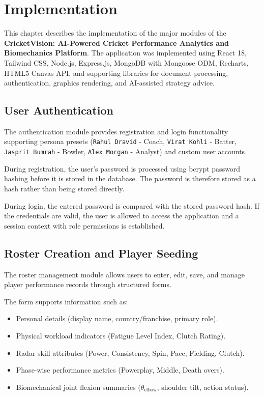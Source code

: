 \chapter{Implementation}

This chapter describes the implementation of the major modules of the \textbf{CricketVision: AI-Powered Cricket Performance Analytics and Biomechanics Platform}. The application was implemented using React 18, Tailwind CSS, Node.js, Express.js, MongoDB with Mongoose ODM, Recharts, HTML5 Canvas API, and supporting libraries for document processing, authentication, graphics rendering, and AI-assisted strategy advice.

\section{User Authentication}
The authentication module provides registration and login functionality supporting persona presets (\texttt{Rahul Dravid} - Coach, \texttt{Virat Kohli} - Batter, \texttt{Jasprit Bumrah} - Bowler, \texttt{Alex Morgan} - Analyst) and custom user accounts.

During registration, the user's password is processed using bcrypt password hashing before it is stored in the database. The password is therefore stored as a hash rather than being stored directly.

During login, the entered password is compared with the stored password hash. If the credentials are valid, the user is allowed to access the application and a session context with role permissions is established.

\section{Roster Creation and Player Seeding}
The roster management module allows users to enter, edit, save, and manage player performance records through structured forms.

The form supports information such as:
\begin{itemize}
    \item Personal details (display name, country/franchise, primary role).
    \item Physical workload indicators (Fatigue Level Index, Clutch Rating).
    \item Radar skill attributes (Power, Consistency, Spin, Pace, Fielding, Clutch).
    \item Phase-wise performance metrics (Powerplay, Middle, Death overs).
    \item Biomechanical joint flexion summaries ($\theta_{\text{elbow}}$, shoulder tilt, action status).
\end{itemize}

